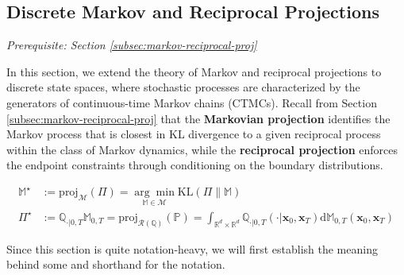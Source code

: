 \documentclass{article}
\newcommand{\boldtext}[1]{\textbf{\textcolor{MyGreen}{#1}}}
\begin{document}
\subsection{Discrete Markov and Reciprocal Projections}
\label{subsec:discrete-markov-reciprocal}
\textit{Prerequisite: Section \ref{subsec:markov-reciprocal-proj}}

In this section, we extend the theory of Markov and reciprocal projections to discrete state spaces, where stochastic processes are characterized by the generators of continuous-time Markov chains (CTMCs). Recall from Section \ref{subsec:markov-reciprocal-proj} that the \boldtext{Markovian projection} identifies the Markov process that is closest in KL divergence to a given reciprocal process within the class of Markov dynamics, while the \boldtext{reciprocal projection} enforces the endpoint constraints through conditioning on the boundary distributions. 
\begin{small}
\begin{align}
    \mathbb{M}^\star&:=\text{proj}_{\mathcal{M}}(\Pi)=\underset{\mathbb{M}\in \mathcal{M}}{\arg\min}\text{KL}\left(\Pi\|\mathbb{M}\right)\tag{Markovian Projection}\\
    \Pi^\star&:=\mathbb{Q}_{\cdot|0,T}\mathbb{M}_{0,T}=\text{proj}_{\mathcal{R}(\mathbb{Q})}(\mathbb{P})=\int_{\mathbb{R}^d\times \mathbb{R}^d}\mathbb{Q}_{\cdot|0,T}(\cdot|\boldsymbol{x}_0, \boldsymbol{x}_T)\mathrm{d}\mathbb{M}_{0,T}(\boldsymbol{x}_0, \boldsymbol{x}_T)\tag{Reciprocal Projection}
\end{align}
\end{small}

Since this section is quite notation-heavy, we will first establish the meaning behind some and shorthand for the notation. 
\end{document}
